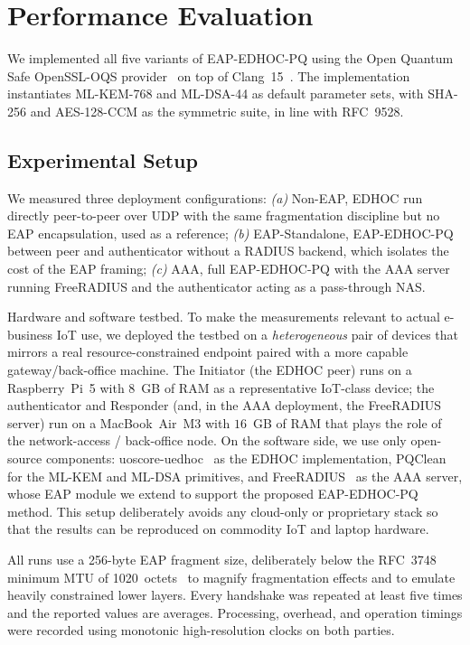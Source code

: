 \documentclass{easychair}
\begin{document}
\section{Performance Evaluation}
\label{performance-evaluation}
We implemented all five variants of EAP-EDHOC-PQ using the Open
Quantum Safe OpenSSL-OQS provider~\cite{openssl_oqs} on top of
Clang~15~\cite{clang15}. The implementation instantiates ML-KEM-768 and
ML-DSA-44 as default parameter sets, with SHA-256 and AES-128-CCM as
the symmetric suite, in line with RFC~9528.

\subsection{Experimental Setup}
We measured three deployment configurations:
\emph{(a)} Non-EAP, EDHOC run directly peer-to-peer over UDP
with the same fragmentation discipline but no EAP encapsulation, used
as a reference;
\emph{(b)} EAP-Standalone, EAP-EDHOC-PQ between peer and
authenticator without a RADIUS backend, which isolates the cost of the
EAP framing;
\emph{(c)} AAA, full EAP-EDHOC-PQ with the AAA server running
FreeRADIUS and the authenticator acting as a pass-through NAS.

Hardware and software testbed. To make the measurements
relevant to actual e-business IoT use, we deployed the testbed on a
\emph{heterogeneous} pair of devices that mirrors a real
resource-constrained endpoint paired with a more capable
gateway/back-office machine. The Initiator (the EDHOC peer) runs on a
Raspberry~Pi~5 with $8$~GB of RAM as a representative
IoT-class device; the authenticator and Responder (and, in the AAA
deployment, the FreeRADIUS server) run on a MacBook~Air~M3
with $16$~GB of RAM that plays the role of the network-access /
back-office node. On the software side, we use only open-source
components: uoscore-uedhoc~\cite{uoscore} as the EDHOC
implementation, PQClean~\cite{pqclean} for the ML-KEM and
ML-DSA primitives, and FreeRADIUS~\cite{freeradius} as the
AAA server, whose EAP module we extend to support the proposed
EAP-EDHOC-PQ method. This setup deliberately avoids any cloud-only or
proprietary stack so that the results can be reproduced on commodity
IoT and laptop hardware.

All runs use a 256-byte EAP fragment size, deliberately below
the RFC~3748 minimum MTU of 1020~octets~\cite{RFC3748,RFC9191} to
magnify fragmentation effects and to emulate heavily constrained
lower layers. Every handshake was repeated at least five times and the
reported values are averages. Processing, overhead, and operation
timings were recorded using monotonic high-resolution clocks on both
parties.
\end{document}
